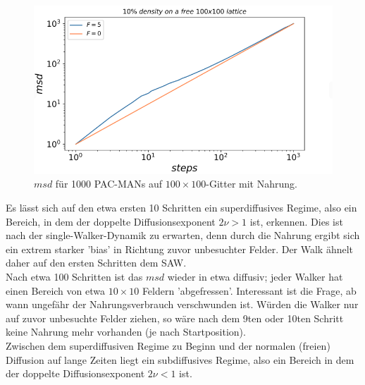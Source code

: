 \documentclass[a4paper, 12pt]{report}
\begin{document}
\begin{figure}[h!]
	\centering
	\includegraphics[scale=0.8]{msd10_1.png}
	\caption{$msd$ für 1000 PAC-MANs auf $100\times 100$-Gitter mit Nahrung.}
\end{figure}

\noindent Es lässt sich auf den etwa ersten 10 Schritten ein superdiffusives Regime, also ein Bereich, in dem der doppelte Diffusionsexponent $2\nu > 1$ ist, erkennen. Dies ist nach der single-Walker-Dynamik zu erwarten, denn durch die Nahrung ergibt sich ein extrem starker 'bias' in Richtung zuvor unbesuchter Felder. Der Walk ähnelt daher auf den ersten Schritten dem SAW.
\\
\noindent Nach etwa 100 Schritten ist das $msd$ wieder in etwa diffusiv; jeder Walker hat einen Bereich von etwa $10\times 10$ Feldern 'abgefressen'. Interessant ist die Frage, ab wann ungefähr der Nahrungsverbrauch verschwunden ist. Würden die Walker nur auf zuvor unbesuchte Felder ziehen, so wäre nach dem 9ten oder 10ten Schritt keine Nahrung mehr vorhanden (je nach Startposition).
\\
\noindent Zwischen dem superdiffusiven Regime zu Beginn und der normalen (freien) Diffusion auf lange Zeiten liegt ein subdiffusives Regime, also ein Bereich in dem der doppelte Diffusionsexponent $2\nu < 1$ ist.
\end{document}
